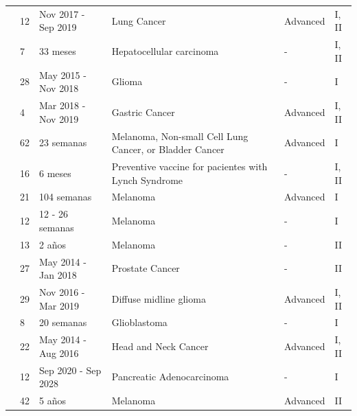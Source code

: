 \begin{table}[h]
{{\begin{tabular}{p{2.8cm}p{0.5cm}p{2.3cm}p{4.5cm}p{1.5cm}p{0.5cm}}
				\cite{cheng2021bertmhc} & 12  & Nov 2017 - Sep 2019 & Lung Cancer & Advanced & I, II \\
				
				\cite{cai2021personalized} & 7  & 33 meses & Hepatocellular carcinoma & -& I, II \\
				
				\cite{platten2021vaccine} & 28  & May 2015 - Nov 2018 & Glioma & -& I \\
				
				
				\cite{cafri2020mrna} & 4  & Mar 2018 - Nov 2019 & Gastric Cancer & Advanced & I, II \\
				
				
				
				
				
				
				\cite{ott2020phase} & 62  & 23 semanas & Melanoma, Non-small Cell Lung Cancer, or Bladder Cancer & Advanced & I \\
				
				
				\cite{kloor2020frameshift} & 16  & 6 meses & Preventive vaccine for pacientes with Lynch Syndrome  &- & I, II \\
				
				
				
				\cite{poran2020combined} & 21  & 104 semanas & Melanoma & Advanced & I \\
				
				\cite{engelhard2020mhc} & 12  & 12 - 26 semanas & Melanoma &- & I \\
				
				\cite{podaza2020evaluation} & 13  & 2 años & Melanoma & -& II \\
				
				\cite{sater2020neoadjuvant} & 27  & May 2014 - Jan 2018 & Prostate Cancer & -& II \\ 
				
				\cite{mueller2022mass} & 29  & Nov 2016 - Mar 2019 & Diffuse midline glioma & Advanced & I, II \\
				
				\cite{keskin2019neoantigen} & 8  & 20 semanas & Glioblastoma & -& I \\
				
				
				\cite{aggarwal2019immunotherapy} & 22  & May 2014 - Aug 2016 & Head and Neck Cancer & Advanced & I, II \\
				
				
				
				
				
				\cite{bassani2019phase} & 12  & Sep 2020 - Sep 2028 & Pancreatic Adenocarcinoma &- & I \\
				
				
				
				
				
				\cite{dillman2018randomized} & 42  & 5 años & Melanoma & Advanced & II \\
			\end{tabular}
		}
	}
\end{table}
